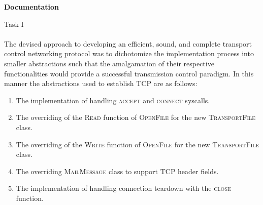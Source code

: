 \documentclass[12pt]{article}
\begin{document}
{\setlength{\parindent}{0cm}
\textbf{Documentation} \\
\begin{center}Task I\end{center}
\paragraph{} The devised approach to developing an efficient, sound, and complete transport control 
    networking protocol was to dichotomize the implementation process into smaller abstractions such that
    the amalgamation of their respective functionalities would provide a successful 
    transmission control paradigm. In this manner the abstractions used to establish TCP are as follows:
    \begin{enumerate}
    \item The implementation of handling \textsc{accept} and \textsc{connect} syscalls. 
    \item The overriding of the \textsc{Read} function of \textsc{OpenFile} for the new \textsc{TransportFile} class. 
    \item The overriding of the \textsc{Write} function of \textsc{OpenFile} for the new \textsc{TransportFile} class. 
    \item The overriding \textsc{MailMessage} class to support TCP header fields.
    \item The implementation of handling connection teardown with the \textsc{close} function.
    \end{enumerate}
}
\end{document}
